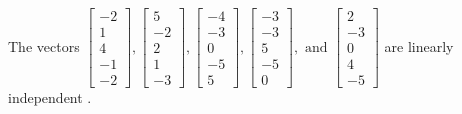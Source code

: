 \begin{exercise}
\begin{exerciseStatement}
  \end{exerciseStatement}
  \begin{exerciseAnswer}
   The vectors \(\left[\begin{array}{r}
-2 \\
1 \\
4 \\
-1 \\
-2
\end{array}\right] , \left[\begin{array}{r}
5 \\
-2 \\
2 \\
1 \\
-3
\end{array}\right] , \left[\begin{array}{r}
-4 \\
-3 \\
0 \\
-5 \\
5
\end{array}\right] , \left[\begin{array}{r}
-3 \\
-3 \\
5 \\
-5 \\
0
\end{array}\right] , \text{ and } \left[\begin{array}{r}
2 \\
-3 \\
0 \\
4 \\
-5
\end{array}\right]\) are 
  	 linearly independent  .
  


  \end{exerciseAnswer}
\end{exercise}